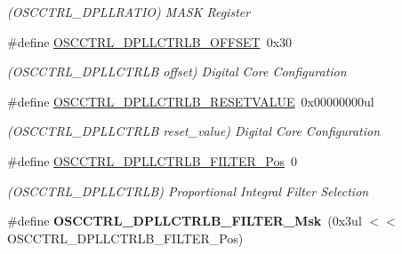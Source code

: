 \begin{DoxyCompactItemize}
\begin{DoxyCompactList}\small\item\em (O\+S\+C\+C\+T\+R\+L\+\_\+\+D\+P\+L\+L\+R\+A\+T\+I\+O) M\+A\+S\+K Register \end{DoxyCompactList}\item 
\hypertarget{group___s_a_m_l21___o_s_c_c_t_r_l_ga71dc4af9ba22fbd5c6aa3d5d371d9a59}{}\#define \hyperlink{group___s_a_m_l21___o_s_c_c_t_r_l_ga71dc4af9ba22fbd5c6aa3d5d371d9a59}{O\+S\+C\+C\+T\+R\+L\+\_\+\+D\+P\+L\+L\+C\+T\+R\+L\+B\+\_\+\+O\+F\+F\+S\+E\+T}~0x30\label{group___s_a_m_l21___o_s_c_c_t_r_l_ga71dc4af9ba22fbd5c6aa3d5d371d9a59}

\begin{DoxyCompactList}\small\item\em (O\+S\+C\+C\+T\+R\+L\+\_\+\+D\+P\+L\+L\+C\+T\+R\+L\+B offset) Digital Core Configuration \end{DoxyCompactList}\item 
\hypertarget{group___s_a_m_l21___o_s_c_c_t_r_l_ga49595cc57a3da5b0553aebc31760e7ca}{}\#define \hyperlink{group___s_a_m_l21___o_s_c_c_t_r_l_ga49595cc57a3da5b0553aebc31760e7ca}{O\+S\+C\+C\+T\+R\+L\+\_\+\+D\+P\+L\+L\+C\+T\+R\+L\+B\+\_\+\+R\+E\+S\+E\+T\+V\+A\+L\+U\+E}~0x00000000ul\label{group___s_a_m_l21___o_s_c_c_t_r_l_ga49595cc57a3da5b0553aebc31760e7ca}

\begin{DoxyCompactList}\small\item\em (O\+S\+C\+C\+T\+R\+L\+\_\+\+D\+P\+L\+L\+C\+T\+R\+L\+B reset\+\_\+value) Digital Core Configuration \end{DoxyCompactList}\item 
\hypertarget{group___s_a_m_l21___o_s_c_c_t_r_l_ga8df5368ebb5161543ef658da3a849a5e}{}\#define \hyperlink{group___s_a_m_l21___o_s_c_c_t_r_l_ga8df5368ebb5161543ef658da3a849a5e}{O\+S\+C\+C\+T\+R\+L\+\_\+\+D\+P\+L\+L\+C\+T\+R\+L\+B\+\_\+\+F\+I\+L\+T\+E\+R\+\_\+\+Pos}~0\label{group___s_a_m_l21___o_s_c_c_t_r_l_ga8df5368ebb5161543ef658da3a849a5e}

\begin{DoxyCompactList}\small\item\em (O\+S\+C\+C\+T\+R\+L\+\_\+\+D\+P\+L\+L\+C\+T\+R\+L\+B) Proportional Integral Filter Selection \end{DoxyCompactList}\item 
\hypertarget{group___s_a_m_l21___o_s_c_c_t_r_l_ga5ee27d501b872aa616aa2131343913db}{}\#define {\bfseries O\+S\+C\+C\+T\+R\+L\+\_\+\+D\+P\+L\+L\+C\+T\+R\+L\+B\+\_\+\+F\+I\+L\+T\+E\+R\+\_\+\+Msk}~(0x3ul $<$$<$ O\+S\+C\+C\+T\+R\+L\+\_\+\+D\+P\+L\+L\+C\+T\+R\+L\+B\+\_\+\+F\+I\+L\+T\+E\+R\+\_\+\+Pos)\label{group___s_a_m_l21___o_s_c_c_t_r_l_ga5ee27d501b872aa616aa2131343913db}


\end{DoxyCompactItemize}
